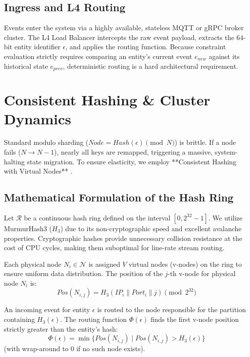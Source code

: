 \documentclass[conference]{IEEEtran}
\begin{document}
\subsection{Ingress and L4 Routing}
Events enter the system via a highly available, stateless MQTT or gRPC broker cluster. The L4 Load Balancer intercepts the raw event payload, extracts the 64-bit entity identifier $\epsilon$, and applies the routing function. Because constraint evaluation strictly requires comparing an entity's current event $e_{new}$ against its historical state $e_{prev}$, deterministic routing is a hard architectural requirement.

\section{Consistent Hashing \& Cluster Dynamics}


Standard modulo sharding ($Node = Hash(\epsilon) \pmod N$) is brittle. If a node fails ($N \to N-1$), nearly all keys are remapped, triggering a massive, system-halting state migration. To ensure elasticity, we employ **Consistent Hashing with Virtual Nodes** \cite{b3}.

\subsection{Mathematical Formulation of the Hash Ring}
Let $\mathcal{R}$ be a continuous hash ring defined on the interval $[0, 2^{32}-1]$. We utilize MurmurHash3 ($H_3$) due to its non-cryptographic speed and excellent avalanche properties. Cryptographic hashes provide unnecessary collision resistance at the cost of CPU cycles, making them suboptimal for line-rate stream routing.

Each physical node $N_i \in \mathcal{N}$ is assigned $V$ virtual nodes (v-nodes) on the ring to ensure uniform data distribution. The position of the $j$-th v-node for physical node $N_i$ is:
\begin{equation}
    Pos(N_{i,j}) = H_3(IP_i \parallel Port_i \parallel j) \pmod{2^{32}}
\end{equation}

An incoming event for entity $\epsilon$ is routed to the node responsible for the partition containing $H_3(\epsilon)$. The routing function $\Phi(\epsilon)$ finds the first v-node position strictly greater than the entity's hash:
\begin{equation}
    \Phi(\epsilon) = \min \{ Pos(N_{i,j}) \mid Pos(N_{i,j}) > H_3(\epsilon) \}
\end{equation}
(with wrap-around to 0 if no such node exists).
\end{document}
